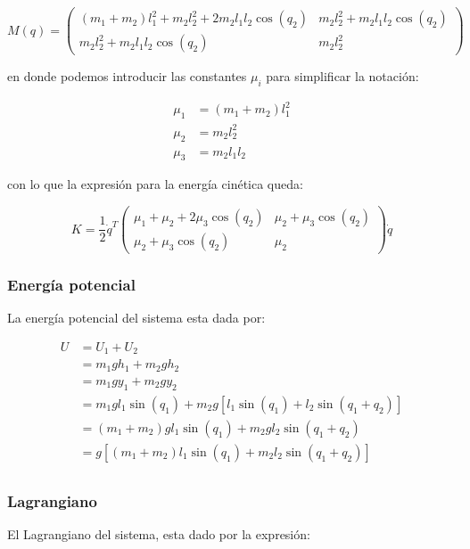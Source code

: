 \documentclass{article}
\begin{document}
\[
M(q) =
\begin{pmatrix}
(m_1 + m_2) l_1^2 + m_2 l_2^2 + 2 m_2 l_1 l_2 \cos{(q_2)} & m_2 l_2^2 + m_2 l_1 l_2 \cos{(q_2)} \\
m_2 l_2^2 + m_2 l_1 l_2 \cos{(q_2)} & m_2 l_2^2
\end{pmatrix}
\]

en donde podemos introducir las constantes \(\mu_i\) para simplificar la
notación:

\[
\begin{align}
\mu_1 &= (m_1 + m_2) l_1^2 \\
\mu_2 &= m_2 l_2^2 \\
\mu_3 &= m_2 l_1 l_2
\end{align}
\]

con lo que la expresión para la energía cinética queda:

\[
K = \frac{1}{2} \dot{q}^T
\begin{pmatrix}
\mu_1 + \mu_2 + 2\mu_3 \cos{(q_2)} & \mu_2 + \mu_3 \cos{(q_2)} \\
\mu_2 + \mu_3 \cos{(q_2)} & \mu_2
\end{pmatrix} \dot{q}
\]

    \subsubsection*{Energía potencial}\label{energuxeda-potencial}

    La energía potencial del sistema esta dada por:

\[
\begin{align}
U &= U_1 + U_2 \\
&= m_1 g h_1 + m_2 g h_2 \\
&= m_1 g y_1 + m_2 g y_2 \\
&= m_1 g l_1 \sin{(q_1)} + m_2 g \left[ l_1 \sin{(q_1)} + l_2 \sin{(q_1 + q_2)} \right] \\
&= \left( m_1 + m_2 \right) g l_1 \sin{(q_1)} + m_2 g l_2 \sin{(q_1 + q_2)} \\
&= g \left[ \left( m_1 + m_2 \right) l_1 \sin{(q_1)} + m_2 l_2 \sin{(q_1 + q_2)} \right] \\
\end{align}
\]

    \subsubsection*{Lagrangiano}\label{lagrangiano}

    El Lagrangiano del sistema, esta dado por la expresión:
\end{document}
